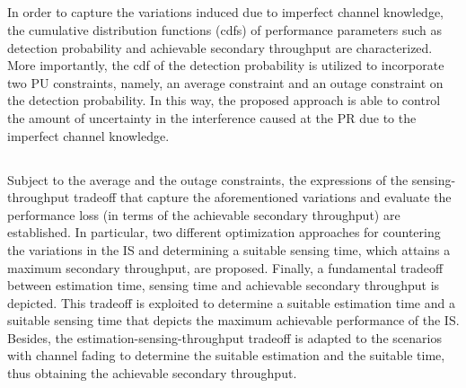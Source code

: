 \subsection{}
In order to capture the variations induced due to imperfect channel knowledge, the cumulative distribution functions (cdfs) of performance parameters such as detection probability and achievable secondary throughput are characterized. More importantly, the cdf of the detection probability is utilized to incorporate two PU constraints, namely, an average constraint and an outage constraint on the detection probability. In this way, the proposed approach is able to control the amount of uncertainty in the interference caused at the PR due to the imperfect channel knowledge. 
\subsection{}
Subject to the average and the outage constraints, the expressions of the sensing-throughput tradeoff that capture the aforementioned variations and evaluate the performance loss (in terms of the achievable secondary throughput) are established. In particular, two different optimization approaches for countering the variations in the IS and determining a suitable sensing time, which attains a maximum secondary throughput, are proposed. Finally, a fundamental tradeoff between estimation time, sensing time and achievable secondary throughput is depicted. This tradeoff is exploited to determine a suitable estimation time and a suitable sensing time that depicts the maximum achievable performance of the IS. 
Besides, %
the estimation-sensing-throughput tradeoff is adapted to the scenarios with channel fading to determine the suitable estimation and the suitable time, thus obtaining the achievable secondary throughput.
 
